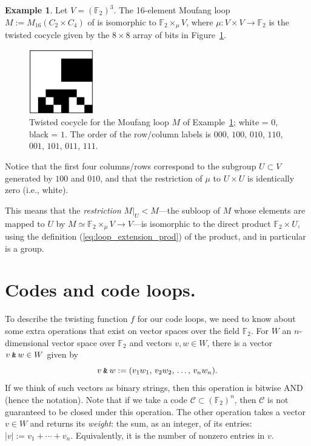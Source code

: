 \documentclass{article}
\theoremstyle{plain}
\theoremstyle{definition}
\newtheorem{example}{Example}
\def \cC {\mathcal{C}}
\def \FF {\mathbb{F}}
\newcommand{\AND}{\mathbin{\textup{\texttt{\&}}}}
\begin{document}
\begin{example}\label{example:m16}
Let $V= (\FF_2)^3$. The 16-element Moufang loop $M := M_{16}(C_2\times C_4)$ of \cite[Theorem 2]{Chein} is isomorphic to $\FF_2 \times_\mu V$,  where  $\mu\colon V\times V\to\FF_2$  is the twisted cocycle given by the $8\times 8$ array of bits in Figure~\ref{fig:cocycle for M}.
\medskip
\begin{figure}[!ht]
\begin{center}
\includegraphics[width=0.25\textwidth]{m16.png}
\end{center}
\caption{Twisted cocycle for the Moufang loop $M$ of Example~\ref{example:m16}; white = $0$, black = $1$. The order of the row/column labels is $000$, $100$, $010$, $110$, $001$, $101$, $011$, $111$. }\label{fig:cocycle for M}
\end{figure}


Notice that the first four columns/rows correspond to the subgroup $U\subset V$ generated by $100$ and $010$, and that the restriction of $\mu$ to $U\times U$ is identically zero (i.e., white). 

This means that the \emph{restriction} $M\big|_U < M$---the subloop of $M$ whose elements are mapped to $U$ by $M \simeq \FF_2\times_\mu V \to V$---is isomorphic to the direct product $\FF_2\times U$, using the definition (\ref{eq:loop_extension_prod}) of the product, and in particular is a group.


\end{example}


\section{Codes and code loops.}

To describe the twisting function $f$ for our code loops, we need to know about some extra operations that exist on vector spaces over the field $\FF_2$. 
For $W$ an $n$-dimensional vector space over $\FF_2$ and vectors $v,w\in W$, there is a vector $v\AND w \in W$ given by
\[
	v\AND w := (v_1w_1,\,v_2w_2,\,\ldots,\,v_nw_n).
\]
If we think of such vectors as binary strings, then this operation is bitwise AND (hence the notation). 
Note that if we take a code $\cC \subset (\FF_2)^n$, then $\cC$ is not guaranteed to be closed under this operation.
The other operation takes a vector $v\in W$ and returns its \emph{weight}: the sum, as an integer, of its entries: $|v| := v_1 + \cdots + v_n$. 
Equivalently, it is the number of nonzero entries in $v$.
\end{document}
